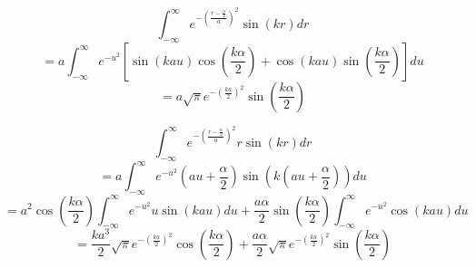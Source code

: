 \documentclass[double,12pt]{beavtex}
\begin{document}
\begin{equation}{\int_{-\infty}^{\infty}{e^{-\left(\frac{r-\frac{\alpha}{2}}{a}\right)^2}\sin(kr)d{r}}}\end{equation} 
\begin{displaymath}{=a\int_{-\infty}^{\infty}{e^{-u^2}\left[\sin(kau)\cos(\frac{k\alpha}{2})+\cos(kau)\sin(\frac{k\alpha}{2})\right]d{u}}}\end{displaymath}  
\begin{equation}{=a\sqrt{\pi}e^{-\left(\frac{ka}{2}\right)^2}\sin(\frac{k\alpha}{2})}\end{equation} 

\begin{equation}{\int_{-\infty}^{\infty}{e^{-\left(\frac{r-\frac{\alpha}{2}}{a}\right)^2}r\sin(kr)d{r}}}\end{equation} 
\begin{displaymath}{=a\int_{-\infty}^{\infty}{e^{-u^2}(au+\frac{\alpha}{2})\sin(k(au+\frac{\alpha}{2}))d{u}}}\end{displaymath} 
\begin{displaymath}{=a^2\cos(\frac{k\alpha}{2})\int_{-\infty}^{\infty}{e^{-u^2}u\sin(kau)d{u} +\frac{a\alpha}{2}\sin(\frac{k\alpha}{2})\int_{-\infty}^{\infty}e^{-u^2}\cos(kau)d{u}}}\end{displaymath} 
\begin{equation}{=\frac{ka^3}{2}\sqrt{\pi}e^{-\left(\frac{ka}{2}\right)^2}\cos(\frac{k\alpha}{2})+\frac{a\alpha}{2}\sqrt{\pi}e^{-\left(\frac{ka}{2}\right)^2}\sin(\frac{k\alpha}{2})}\end{equation} 
\end{document}
